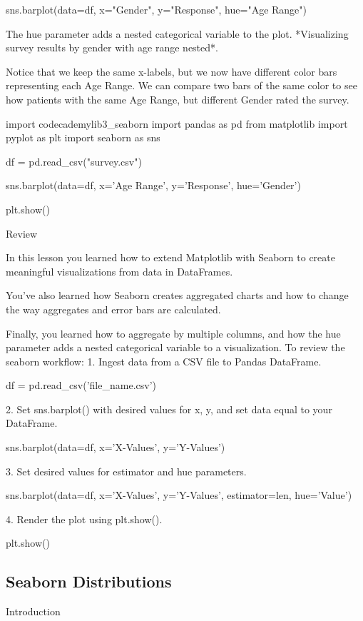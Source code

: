 \documentclass{journal}
\begin{document}
sns.barplot(data=df,
            x="Gender",
            y="Response",
            hue="Age Range")

The hue parameter adds a nested categorical variable to the plot.
*Visualizing survey results by gender with age range nested*.

Notice that we keep the same x-labels, but we now have different color bars representing each Age Range. We can compare two bars of the same color to see how patients with the same Age Range, but different Gender rated the survey.


import codecademylib3_seaborn
import pandas as pd
from matplotlib import pyplot as plt
import seaborn as sns

df = pd.read_csv("survey.csv")

sns.barplot(data=df, x='Age Range', y='Response', hue='Gender')

plt.show()



Review

In this lesson you learned how to extend Matplotlib with Seaborn to create meaningful visualizations from data in DataFrames.

You’ve also learned how Seaborn creates aggregated charts and how to change the way aggregates and error bars are calculated.

Finally, you learned how to aggregate by multiple columns, and how the hue parameter adds a nested categorical variable to a visualization.
To review the seaborn workflow:
1. Ingest data from a CSV file to Pandas DataFrame.

df = pd.read_csv('file_name.csv')

2. Set sns.barplot() with desired values for x, y, and set data equal to your DataFrame.

sns.barplot(data=df, x='X-Values', y='Y-Values')

3. Set desired values for estimator and hue parameters.

sns.barplot(data=df, x='X-Values', y='Y-Values', estimator=len, hue='Value')

4. Render the plot using plt.show().

plt.show()



\subsection{Seaborn Distributions}

Introduction
\end{document}
